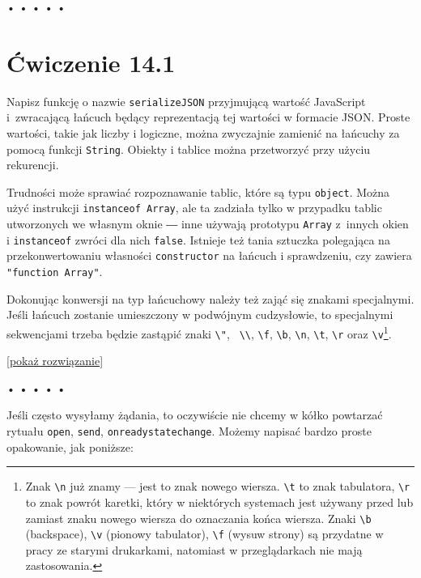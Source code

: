 \begin{center}
• • • • •
\end{center}

  
\section*{Ćwiczenie 14.1}
\label{sec:14.1}
  
    
Napisz funkcję o nazwie \texttt{serializeJSON} przyjmującą wartość JavaScript i~zwracającą łańcuch będący reprezentacją tej wartości w formacie JSON. Proste wartości, takie jak liczby i logiczne, można zwyczajnie zamienić na łańcuchy za pomocą funkcji \texttt{String}. Obiekty i tablice można przetworzyć przy użyciu rekurencji.

    
Trudności może sprawiać rozpoznawanie tablic, które są typu \texttt{object}. Można użyć instrukcji \texttt{instanceof Array}, ale ta zadziała tylko w przypadku tablic utworzonych we własnym oknie ― inne używają prototypu \texttt{Array} z~innych okien i \texttt{instanceof} zwróci dla nich \texttt{false}. Istnieje też tania sztuczka polegająca na przekonwertowaniu własności \texttt{constructor} na łańcuch i sprawdzeniu, czy zawiera \texttt{"function Array"}.

    
Dokonując konwersji na typ łańcuchowy należy też zająć się znakami specjalnymi. Jeśli łańcuch zostanie umieszczony w podwójnym cudzysłowie, to specjalnymi sekwencjami trzeba będzie zastąpić znaki \texttt{\textbackslash "}, \texttt{ \textbackslash \textbackslash}, \texttt{\textbackslash f}, \texttt{\textbackslash b}, \texttt{\textbackslash n}, \texttt{\textbackslash t}, \texttt{\textbackslash r} oraz \texttt{\textbackslash v}\footnote{Znak \texttt{\textbackslash n} już znamy — jest to znak nowego wiersza. \texttt{\textbackslash t} to znak tabulatora, \texttt{\textbackslash r} to znak powrót karetki, który w niektórych systemach jest używany przed lub zamiast znaku nowego wiersza do oznaczania końca wiersza. Znaki \texttt{\textbackslash b} (backspace), \texttt{\textbackslash v} (pionowy tabulator), \texttt{\textbackslash f} (wysuw strony) są przydatne w pracy ze starymi drukarkami, natomiast w przeglądarkach nie mają zastosowania.}.

  
[\hyperref[sol:14.1]{pokaż rozwiązanie}]
  


\begin{center}
• • • • •
\end{center}

  
Jeśli często wysyłamy żądania, to oczywiście nie chcemy w kółko powtarzać rytuału \texttt{open}, \texttt{send}, \texttt{onreadystatechange}. Możemy napisać bardzo proste opakowanie, jak poniższe:

